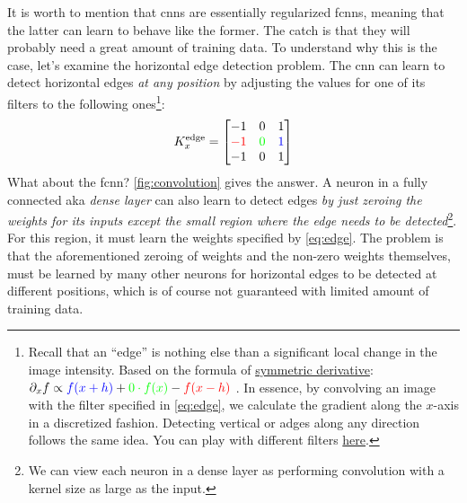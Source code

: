 It is worth to mention that \glspl{cnn} are essentially regularized \glspl{fcnn},
meaning that the latter can learn to behave like the former. The catch is that
they will probably need a great amount of training data. To understand why this
is the case, let's examine the horizontal edge detection problem. The
\gls{cnn} can learn to detect horizontal edges \emph{at any position} by
adjusting the values for one of its filters to the following
ones\footnote{Recall that an ``edge'' is nothing else than a significant
local change in the image intensity. Based on the formula of
\href{https://en.wikipedia.org/wiki/Symmetric_derivative}{symmetric derivative}:
$
	\partial_x f
	\propto \textcolor{blue}{f(x+h)}
	+ \textcolor{green}{0 \cdot f(x)}
	- \textcolor{red}{f(x-h)}
$
. In essence, by convolving an image with the filter specified in
\Equation{} \ref{eq:edge}, we calculate the gradient along the $x$-axis in a
discretized fashion. Detecting vertical or adges along any direction follows the
same idea. You can play with different filters
\href{https://setosa.io/ev/image-kernels/}{here}.}:
\begin{equation}
	\label{eq:edge}
	K_x^{\text{edge}} =
	\begin{bmatrix}
		-1 & 0 & 1 \\
		\color{red}{-1} & \color{green}{0} & \color{blue}{1} \\
		-1 & 0 & 1 \\
	\end{bmatrix}
\end{equation}
What about the \gls{fcnn}? \Figure{} \ref{fig:convolution} gives the answer. A
neuron in a fully connected aka \emph{dense layer} can also
learn to detect edges \emph{by just zeroing the weights for its inputs except
the small region where the edge needs to be detected}\footnote{We can view each
neuron in a dense layer as performing convolution with a kernel
size as large as the input.}. For this region, it must learn
the weights specified by \Equation{} \ref{eq:edge}.  The problem is that the
aforementioned zeroing of weights and the non-zero weights themselves, must be
learned by many other neurons for horizontal edges to be
detected at different positions, which is of course not guaranteed with limited
amount of training data.

